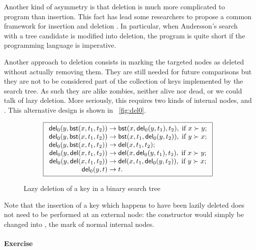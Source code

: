 Another kind of asymmetry is that deletion is much more complicated to
program than insertion. This fact has lead some researchers to propose
a common framework for insertion and deletion
\citep{Andersson_1991,Hinze_2002}. In particular, when Andersson's
search with a tree candidate is modified into deletion, the program is
quite short if the programming language is imperative.

Another approach to deletion consists in marking the targeted nodes as
deleted without actually removing them. They are still needed for
future comparisons but they are not to be considered part of the
collection of keys implemented by the search tree. As such they are
alike zombies, neither alive nor dead, or we could talk of lazy
deletion. More seriously, this requires two kinds of internal nodes,
 and . This alternative
design is shown in \fig~\vref{fig:del0}.
\begin{figure}[b]
\begin{equation*}
\boxed{
\begin{array}{r@{\;}l@{\;}l}
  \fun{del}_0(y,\fun{bst}(x,t_1,t_2)) & \rightarrow &
  \fun{bst}(x,\fun{del}_0(y,t_1),t_2),\; \text{if \(x \succ y\)};\\
\fun{del}_0(y,\fun{bst}(x,t_1,t_2)) & \rightarrow &
  \fun{bst}(x,t_1,\fun{del}_0(y,t_2)),\; \text{if \(y \succ x\)};\\
\fun{del}_0(y,\fun{bst}(x,t_1,t_2)) & \rightarrow & 
  \fun{del}(x,t_1,t_2);\\
\fun{del}_0(y,\fun{del}(x,t_1,t_2)) & \rightarrow &
  \fun{del}(x,\fun{del}_0(y,t_1),t_2),\; \text{if \(x \succ y\)};\\
\fun{del}_0(y,\fun{del}(x,t_1,t_2)) & \rightarrow &
  \fun{del}(x,t_1,\fun{del}_0(y,t_2)),\; \text{if \(y \succ x\)};\\
\fun{del}_0(y,t) & \rightarrow & t.\\
\end{array}}
\end{equation*}
\caption{Lazy deletion of a key in a binary search tree\label{fig:del0}}
\end{figure}
Note that the insertion of a key which happens to have been lazily
deleted does not need to be performed at an external node: the
constructor  would simply be changed into , the
mark of normal internal nodes.

\paragraph{Exercise}

